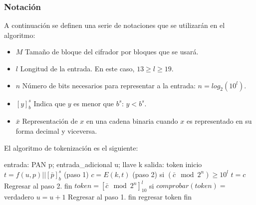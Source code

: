 \subsubsection{Notación}
A continuación se definen una serie de notaciones que se utilizarán en el
algoritmo:
\begin{itemize}
  \item $ M $ Tamaño de bloque del cifrador por bloques que se usará.
  \item $ l $ Longitud de la entrada. En este caso, $13 \geq l \geq 19$.
  \item $ n $ Número de bits necesarios para representar a la entrada:
    $n = log_2(10^l)$.
  \item $ [y]^s_b $ Indica que $y$ es menor que $b^s$: $y < b^s$.
  \item $\bar{x}$ Representación de $x$ en una cadena binaria cuando $x$ es
    representado en su forma decimal y viceversa.
\end{itemize}


El algoritmo de tokenización es el siguiente:
\begin{pseudocodigo}[%
    caption={Híbrido reversible, método de tokenización}
  ]
    entrada: PAN p; entrada_adicional u; llave k
    salida:  token
    inicio
      $t = f(u, p) || [\bar{p}]^s_b$ (paso 1)
      $c = E(k, t)$ (paso 2)
      si $(\bar{c} \mod 2^n) \geq 10^l$
        $t = c$
        Regresar al paso 2.
      fin
      $token = {[\bar{c} \mod 2^n]}^l_{10}$
      si $comprobar(token) =$ verdadero
        $u = u + 1$
        Regresar al paso 1.
      fin
      regresar token
    fin
\end{pseudocodigo}
